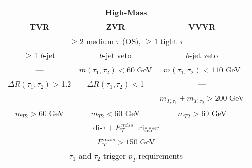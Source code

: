 %
\begin{tabular}{ccc}
\hline
\multicolumn{3}{c}{\textbf{High-Mass}} \\ \hline
\textbf{TVR} & \textbf{ZVR} & \textbf{VVVR} \\ \hline
\multicolumn{3}{c}{$\geq2$ medium $\tau$ (OS), $\geq1$ tight $\tau$} \\
\multicolumn{1}{c|}{$\geq$1 $b$-jet} & \multicolumn{1}{c|}{$b$-jet veto} & $b$-jet veto \\
\multicolumn{1}{c|}{---} & \multicolumn{1}{c|}{$m(\tau_1,\tau_2)<60$ GeV} & $m(\tau_1,\tau_2)<110$ GeV \\
\multicolumn{1}{c|}{$\Delta R(\tau_1,\tau_2)>$1.2} & \multicolumn{1}{c|}{$\Delta R(\tau_1,\tau_2)<$1} & --- \\
\multicolumn{1}{c|}{---} & \multicolumn{1}{c|}{---} & $m_{T,\tau_1}+m_{T,\tau_2}>200$ GeV \\
\multicolumn{1}{c|}{$m_{T2} > $60 GeV} & \multicolumn{1}{c|}{$m_{T2} < $60 GeV} & $m_{T2} > $60 GeV \\
\multicolumn{3}{c}{di-$\tau+E_T^{miss}$ trigger} \\
\multicolumn{3}{c}{$E_T^{miss}>150$ GeV} \\
\multicolumn{3}{c}{$\tau_1$ and $\tau_2$ trigger $p_T$  requirements} \\ \hline
\end{tabular}

%
%